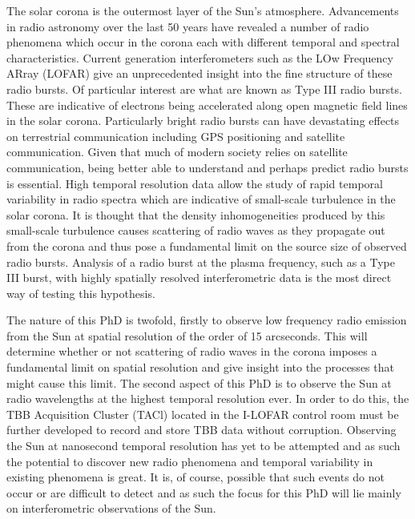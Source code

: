 \begin{abstracts} 

The solar corona is the outermost layer of the Sun's atmosphere. Advancements in radio astronomy over the last 50 years have revealed a number of radio phenomena which occur in the corona each with different temporal and spectral characteristics. Current generation interferometers such as the LOw Frequency ARray (LOFAR) give an unprecedented insight into the fine structure of these radio bursts. Of particular interest are what are known as Type III radio bursts. These are indicative of electrons being accelerated along open magnetic field lines in the solar corona. Particularly bright radio bursts can have devastating effects on terrestrial communication including GPS positioning and satellite communication. Given that much of modern society relies on satellite communication, being better able to understand and perhaps predict radio bursts is essential. High temporal resolution data allow the study of rapid temporal variability in radio spectra which are indicative of small-scale turbulence in the solar corona. It is thought that the density inhomogeneities produced by this small-scale turbulence causes scattering of radio waves as they propagate out from the corona and thus pose a fundamental limit on the source size of observed radio bursts. Analysis of a radio burst at the plasma frequency, such as a Type III burst, with highly spatially resolved interferometric data is the most direct way of testing this hypothesis.%

The nature of this PhD is twofold, firstly to observe low frequency radio emission from the Sun at spatial resolution of the order of 15 arcseconds. This will determine whether or not scattering of radio waves in the corona imposes a fundamental limit on spatial resolution and give insight into the processes that might cause this limit. The second aspect of this PhD is to observe the Sun at radio wavelengths at the highest temporal resolution ever. In order to do this, the TBB Acquisition Cluster (TACl) located in the I-LOFAR control room must be further developed to record and store TBB data without corruption. Observing the Sun at nanosecond temporal resolution has yet to be attempted and as such the potential to discover new radio phenomena and temporal variability in existing phenomena is great. It is, of course, possible that such events do not occur or are difficult to detect and as such the focus for this PhD will lie mainly on interferometric observations of the Sun.


\end{abstracts}
